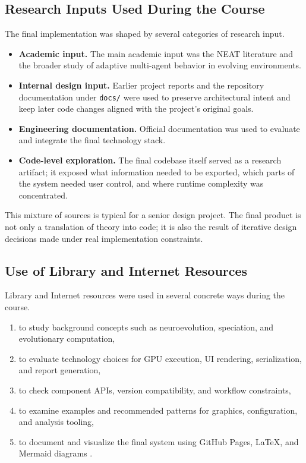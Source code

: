 \subsection{Research Inputs Used During the Course}

The final implementation was shaped by several categories of research input.

\begin{itemize}[nosep]
  \item \textbf{Academic input.} The main academic input was the NEAT literature and the broader
    study of adaptive multi-agent behavior in evolving environments.
  \item \textbf{Internal design input.} Earlier project reports and the repository documentation
    under \texttt{docs/} were used to preserve architectural intent and keep later code changes
    aligned with the project's original goals.
  \item \textbf{Engineering documentation.} Official documentation was used to evaluate and
    integrate the final technology stack.
  \item \textbf{Code-level exploration.} The final codebase itself served as a research artifact;
    it exposed what information needed to be exported, which parts of the system needed user
    control, and where runtime complexity was concentrated.
\end{itemize}

This mixture of sources is typical for a senior design project. The final product is not only a
translation of theory into code; it is also the result of iterative design decisions made under
real implementation constraints.

\subsection{Use of Library and Internet Resources}

Library and Internet resources were used in several concrete ways during the course.

\begin{enumerate}[nosep]
  \item to study background concepts such as neuroevolution, speciation, and evolutionary
    computation,
  \item to evaluate technology choices for GPU execution, UI rendering, serialization, and
    report generation,
  \item to check component APIs, version compatibility, and workflow constraints,
  \item to examine examples and recommended patterns for graphics, configuration, and analysis
    tooling,
  \item to document and visualize the final system using GitHub Pages, LaTeX, and Mermaid
    diagrams \cite{mermaid}.
\end{enumerate}

